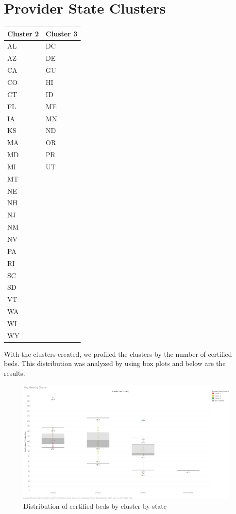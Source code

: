 \documentclass{article}
\theoremstyle{mytheoremstyle}
\theoremstyle{mytheoremstyle}
\theoremstyle{myproblemstyle}
\begin{document}
\section*{Provider State Clusters}

\begin{tabular}{@{}ll@{}}
\toprule
\textbf{Cluster 2} & \textbf{Cluster 3} \\
\midrule
AL & DC \\
AZ & DE \\
CA & GU \\
CO & HI \\
CT & ID \\
FL & ME \\
IA & MN \\
KS & ND \\
MA & OR \\
MD & PR \\
MI & UT \\
MT &  \\
NE &  \\
NH &  \\
NJ &  \\
NM &  \\
NV &  \\
PA &  \\
RI &  \\
SC &  \\
SD &  \\
VT &  \\
WA &  \\
WI &  \\
WY &  \\
\end{tabular}

\pagebreak
With the clusters created, we profiled the clusters by the number of certified beds. This distribution was analyzed by using box plots and below are the results. 
\begin{figure}[htbp]
\centering
\includegraphics[width=\linewidth]{Images/Avg. Beds by Cluster.png}
\caption{Distribution of certified beds by cluster by state}
\label{bed dist.}
\end{figure}
\end{document}
